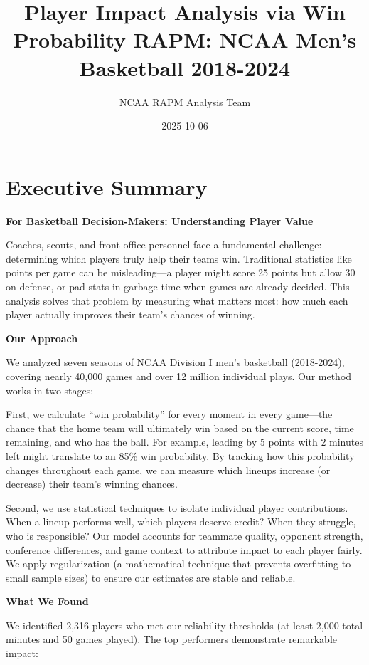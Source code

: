 \documentclass[
  letterpaper,
  DIV=11,
  numbers=noendperiod]{scrartcl}
\title{Player Impact Analysis via Win Probability RAPM: NCAA Men's
Basketball 2018-2024}
\author{NCAA RAPM Analysis Team}
\date{2025-10-06}
\renewcommand*\contentsname{Table of contents}
\newcommand\contentsname{Table of contents}
\begin{document}
\maketitle

\renewcommand*\contentsname{Table of contents}
{
\hypersetup{linkcolor=}
\setcounter{tocdepth}{3}
\tableofcontents
}

\section{Executive Summary}\label{executive-summary}

\textbf{For Basketball Decision-Makers: Understanding Player Value}

Coaches, scouts, and front office personnel face a fundamental
challenge: determining which players truly help their teams win.
Traditional statistics like points per game can be misleading---a player
might score 25 points but allow 30 on defense, or pad stats in garbage
time when games are already decided. This analysis solves that problem
by measuring what matters most: how much each player actually improves
their team's chances of winning.

\textbf{Our Approach}

We analyzed seven seasons of NCAA Division I men's basketball
(2018-2024), covering nearly 40,000 games and over 12 million individual
plays. Our method works in two stages:

First, we calculate ``win probability'' for every moment in every
game---the chance that the home team will ultimately win based on the
current score, time remaining, and who has the ball. For example,
leading by 5 points with 2 minutes left might translate to an 85\% win
probability. By tracking how this probability changes throughout each
game, we can measure which lineups increase (or decrease) their team's
winning chances.

Second, we use statistical techniques to isolate individual player
contributions. When a lineup performs well, which players deserve
credit? When they struggle, who is responsible? Our model accounts for
teammate quality, opponent strength, conference differences, and game
context to attribute impact to each player fairly. We apply
regularization (a mathematical technique that prevents overfitting to
small sample sizes) to ensure our estimates are stable and reliable.

\textbf{What We Found}

We identified 2,316 players who met our reliability thresholds (at least
2,000 total minutes and 50 games played). The top performers demonstrate
remarkable impact:
\end{document}
